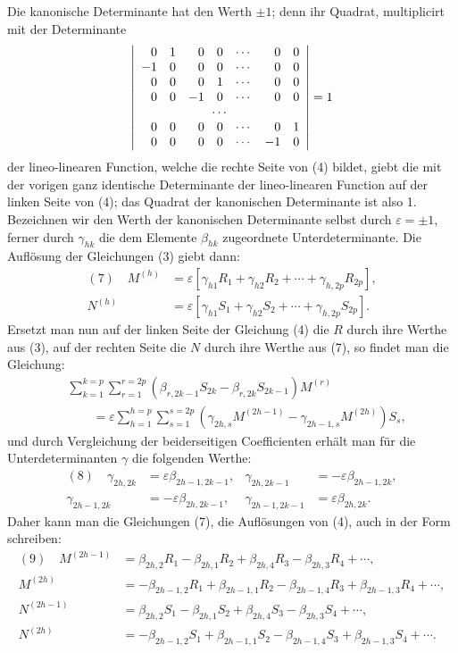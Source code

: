 \documentclass[10pt]{article}
\begin{document}
Die kanonische Determinante hat den Werth \(\pm1\); denn ihr Quadrat, multiplicirt mit der Determinante
\[
\left|
\begin{array}{rrrrrrr}
0&1&0&0&\cdots&0&0\\
-1&0&0&0&\cdots&0&0\\
0&0&0&1&\cdots&0&0\\
0&0&-1&0&\cdots&0&0\\
\multicolumn{7}{c}{\cdots}\\
0&0&0&0&\cdots&0&1\\
0&0&0&0&\cdots&-1&0
\end{array}
\right|=1
\]
der lineo-linearen Function, welche die rechte Seite von (4) bildet, giebt die mit der vorigen ganz identische Determinante der lineo-linearen Function auf der linken Seite von (4); das Quadrat der kanonischen Determinante ist also 1. Bezeichnen wir den Werth der kanonischen Determinante selbst durch \(\varepsilon=\pm1\), ferner durch \(\gamma_{hk}\) die dem Elemente \(\beta_{hk}\) zugeordnete Unterdeterminante. Die Auflösung der Gleichungen (3) giebt dann:
\[
\begin{aligned}
(7)\quad
M^{(h)}&=\varepsilon[\gamma_{h1}R_1+\gamma_{h2}R_2+\cdots+\gamma_{h,2p}R_{2p}],\\
N^{(h)}&=\varepsilon[\gamma_{h1}S_1+\gamma_{h2}S_2+\cdots+\gamma_{h,2p}S_{2p}].
\end{aligned}
\]
Ersetzt man nun auf der linken Seite der Gleichung (4) die \(R\) durch ihre Werthe aus (3), auf der rechten Seite die \(N\) durch ihre Werthe aus (7), so findet man die Gleichung:
\[
\begin{aligned}
&\sum_{k=1}^{k=p}\sum_{r=1}^{r=2p}(\beta_{r,2k-1}S_{2k}-\beta_{r,2k}S_{2k-1})M^{(r)}\\
&\hspace{2em}=\varepsilon\sum_{h=1}^{h=p}\sum_{s=1}^{s=2p}
(\gamma_{2h,s}M^{(2h-1)}-\gamma_{2h-1,s}M^{(2h)})S_s,
\end{aligned}
\]
und durch Vergleichung der beiderseitigen Coefficienten erhält man für die Unterdeterminanten \(\gamma\) die folgenden Werthe:
\[
\begin{array}{rlrl}
(8)\quad
\gamma_{2h,2k}&=\varepsilon\beta_{2h-1,2k-1},&
\gamma_{2h,2k-1}&=-\varepsilon\beta_{2h-1,2k},\\
\gamma_{2h-1,2k}&=-\varepsilon\beta_{2h,2k-1},&
\gamma_{2h-1,2k-1}&=\varepsilon\beta_{2h,2k}.
\end{array}
\]
Daher kann man die Gleichungen (7), die Auflösungen von (4), auch in der Form schreiben:
\[
\begin{aligned}
(9)\quad
M^{(2h-1)}&=\beta_{2h,2}R_1-\beta_{2h,1}R_2+\beta_{2h,4}R_3-\beta_{2h,3}R_4+\cdots,\\
M^{(2h)}&=-\beta_{2h-1,2}R_1+\beta_{2h-1,1}R_2-\beta_{2h-1,4}R_3+\beta_{2h-1,3}R_4+\cdots,\\
N^{(2h-1)}&=\beta_{2h,2}S_1-\beta_{2h,1}S_2+\beta_{2h,4}S_3-\beta_{2h,3}S_4+\cdots,\\
N^{(2h)}&=-\beta_{2h-1,2}S_1+\beta_{2h-1,1}S_2-\beta_{2h-1,4}S_3+\beta_{2h-1,3}S_4+\cdots.
\end{aligned}
\]
\end{document}
